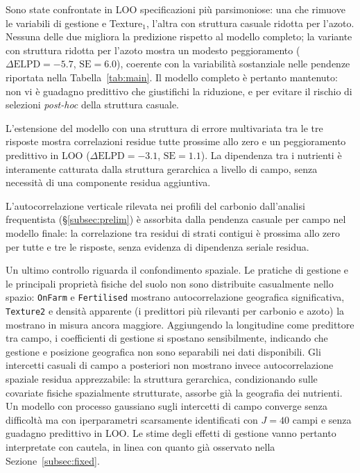 \documentclass[11pt, a4paper]{article}
\begin{document}
Sono state confrontate in LOO specificazioni più parsimoniose: una che rimuove le variabili di gestione e Texture$_1$, l'altra con struttura casuale ridotta per l'azoto. Nessuna delle due migliora la predizione rispetto al modello completo; la variante con struttura ridotta per l'azoto mostra un modesto peggioramento ($\Delta\text{ELPD} = -5.7$, $\text{SE} = 6.0$), coerente con la variabilità sostanziale nelle pendenze riportata nella Tabella~\ref{tab:main}. Il modello completo è pertanto mantenuto: non vi è guadagno predittivo che giustifichi la riduzione, e per evitare il rischio di selezioni \textit{post-hoc} della struttura casuale.

L'estensione del modello con una struttura di errore multivariata tra le tre risposte mostra correlazioni residue tutte prossime allo zero e un peggioramento predittivo in LOO ($\Delta\text{ELPD} = -3.1$, $\text{SE} = 1.1$). La dipendenza tra i nutrienti è interamente catturata dalla struttura gerarchica a livello di campo, senza necessità di una componente residua aggiuntiva.

L'autocorrelazione verticale rilevata nei profili del carbonio dall'analisi frequentista (§\ref{subsec:prelim}) è assorbita dalla pendenza casuale per campo nel modello finale: la correlazione tra residui di strati contigui è prossima allo zero per tutte e tre le risposte, senza evidenza di dipendenza seriale residua.

Un ultimo controllo riguarda il confondimento spaziale. Le pratiche di gestione e le principali proprietà fisiche del suolo non sono distribuite casualmente nello spazio: \texttt{OnFarm} e \texttt{Fertilised} mostrano autocorrelazione geografica significativa, \texttt{Texture2} e densità apparente (i predittori più rilevanti per carbonio e azoto) la mostrano in misura ancora maggiore. Aggiungendo la longitudine come predittore tra campo, i coefficienti di gestione si spostano sensibilmente, indicando che gestione e posizione geografica non sono separabili nei dati disponibili. Gli intercetti casuali di campo a posteriori non mostrano invece autocorrelazione spaziale residua apprezzabile: la struttura gerarchica, condizionando sulle covariate fisiche spazialmente strutturate, assorbe già la geografia dei nutrienti. Un modello con processo gaussiano sugli intercetti di campo converge senza difficoltà ma con iperparametri scarsamente identificati con $J=40$ campi e senza guadagno predittivo in LOO. Le stime degli effetti di gestione vanno pertanto interpretate con cautela, in linea con quanto già osservato nella Sezione~\ref{subsec:fixed}.
\end{document}
